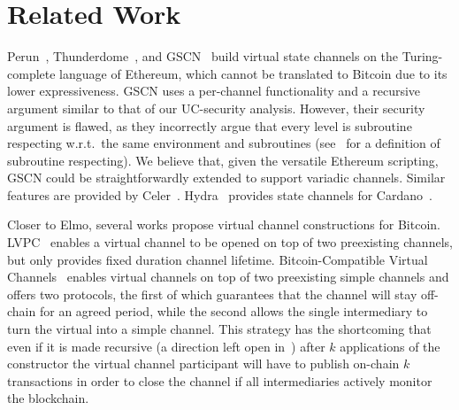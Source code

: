 \section{Related Work}
\label{sec:short-related-work}
Perun~\cite{perun},
Thunderdome~\cite{avarikioti2025thunderdometimelockfreerationallysecurevirtual},
and GSCN~\cite{DBLP:conf/ccs/DziembowskiFH18} build virtual state channels on
the Turing-complete language of Ethereum, which cannot be translated to Bitcoin
due to its lower expressiveness.
  GSCN uses a per-channel functionality and a recursive argument similar
  to that of our UC-security analysis. However, their security argument is
  flawed, as they incorrectly argue that every level is subroutine respecting
  w.r.t.\ the same environment and subroutines
  (see~\cite{DBLP:conf/tcc/BadertscherCHTZ20} for a definition of subroutine
  respecting).
  We believe that, given the versatile Ethereum scripting, GSCN could be
  straightforwardly extended to support variadic channels.
  Similar features are provided by Celer~\cite{dong2018celer}.
  Hydra~\cite{cryptoeprint:2020:299} provides state channels for
  Cardano~\cite{cardano}.

  Closer to Elmo, several works propose virtual channel constructions
  for Bitcoin. LVPC~\cite{10.1007/978-3-030-65411-5_18} enables a virtual channel to be
  opened on top of two preexisting channels,
  but only provides fixed duration channel lifetime.
  Bitcoin-Compatible Virtual Channels~\cite{9519487} enables
  virtual channels on top of two preexisting simple channels
  and offers two protocols, the first of which guarantees that the channel will
  stay off-chain for an agreed period, while the second allows the single intermediary
  to turn the virtual into a simple channel.
  This strategy has the shortcoming that even if it is made
  recursive (a direction left open in~\cite{9519487}) after $k$
  applications of the constructor the virtual channel participant will have to
  publish on-chain $k$ transactions in order to close the channel if all
  intermediaries actively monitor the blockchain.

